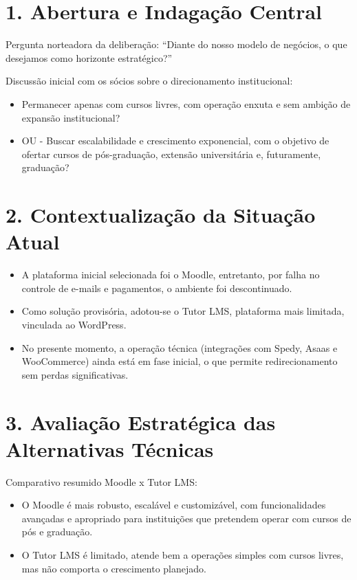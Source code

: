 \documentclass[12pt, a4paper]{letter} %
\begin{document}
\section{1. Abertura e Indagação Central}
Pergunta norteadora da deliberação: “Diante do nosso modelo de negócios, o que desejamos como horizonte estratégico?”

Discussão inicial com os sócios sobre o direcionamento institucional:
\begin{itemize}
	\item Permanecer apenas com cursos livres, com operação enxuta e sem ambição de expansão institucional?
	\item OU - Buscar escalabilidade e crescimento exponencial, com o objetivo de ofertar cursos de pós-graduação, extensão universitária e, futuramente, graduação?
\end{itemize}

\section{2. Contextualização da Situação Atual}
\begin{itemize}
	\item A plataforma inicial selecionada foi o Moodle, entretanto, por falha no controle de e-mails e pagamentos, o ambiente foi descontinuado.
	\item Como solução provisória, adotou-se o Tutor LMS, plataforma mais limitada, vinculada ao WordPress.
	\item No presente momento, a operação técnica (integrações com Spedy, Asaas e WooCommerce) ainda está em fase inicial, o que permite redirecionamento sem perdas significativas.
\end{itemize}

\clearpage
\section{3. Avaliação Estratégica das Alternativas Técnicas}
Comparativo resumido Moodle x Tutor LMS:
\begin{itemize}
	\item O Moodle é mais robusto, escalável e customizável, com funcionalidades avançadas e apropriado para instituições que pretendem operar com cursos de pós e graduação.
	\item O Tutor LMS é limitado, atende bem a operações simples com cursos livres, mas não comporta o crescimento planejado.
\end{itemize}
\end{document}
